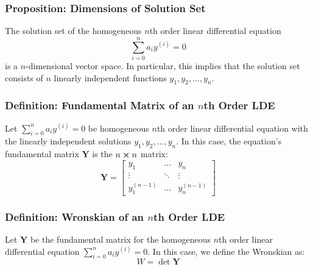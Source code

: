 \documentclass[11pt, a4paper]{article}
\begin{document}

\subsubsection{Proposition: Dimensions of Solution Set}
The solution set of the homogeneous $ n $th order linear differential equation
\begin{equation*}
	\sum_{i=0}^{n} a_i y^{(i)} = 0
\end{equation*}
is a $ n $-dimensional vector space. In particular, this implies that the solution set consists of $ n $ linearly independent functions $ y_1, y_2, \dots, y_n $.

\subsubsection{Definition: Fundamental Matrix of an $ n $th Order LDE}
Let $ \sum_{i=0}^{n} a_i y^{(i)} = 0 $ be homogeneous $ n $th order linear differential equation with the linearly independent solutions $ y_1, y_2, \dots, y_n $. In this case, the equation's fundamental matrix $ \mathbf{Y} $ is the $ n \cross n $ matrix:
\[\mathbf{Y} = \begin{bmatrix}
	y_1 & \dots & y_n\\[1.0ex]
	\vdots & \ddots & \vdots \\[1.0ex]
	y_1^{(n-1)} & \dots & y_n^{(n-1)}
\end{bmatrix}\]

\subsubsection{Definition: Wronskian of an $ n $th Order LDE}
Let $ \mathbf{Y} $ be the fundamental matrix for the homogeneous $ n $th order linear differential equation $ \sum_{i=0}^{n} a_i y^{(i)} = 0 $. In this case, we define the Wronskian as:
\begin{equation*}
	W = \det \mathbf{Y}
\end{equation*}
\end{document}
